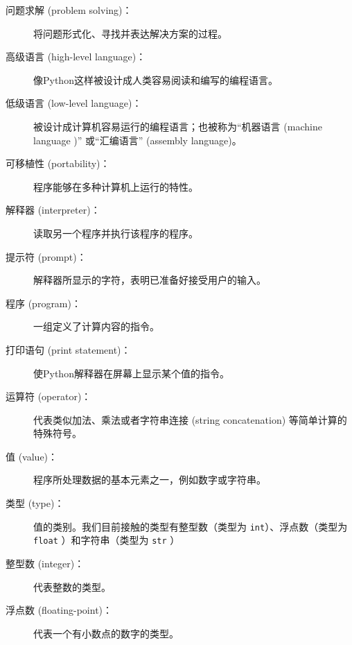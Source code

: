\begin{description}

\item[问题求解 (problem solving)：]  将问题形式化、寻找并表达解决方案的过程。
  

\item[高级语言 (high-level language)：]  像Python这样被设计成人类容易阅读和编写的编程语言。
  

\item[低级语言 (low-level language)：]  被设计成计算机容易运行的编程语言；也被称为``机器语言 (machine language )'' 或``汇编语言'' (assembly language)。
  

\item[可移植性 (portability)：]  程序能够在多种计算机上运行的特性。
  

\item[解释器 (interpreter)：]  读取另一个程序并执行该程序的程序。
  

\item[提示符 (prompt)：] 解释器所显示的字符，表明已准备好接受用户的输入。
  

\item[程序 (program)：] 一组定义了计算内容的指令。
  

\item[打印语句 (print statement)：]  使Python解释器在屏幕上显示某个值的指令。
  
  

\item[运算符 (operator)：]  代表类似加法、乘法或者字符串连接 (string concatenation) 等简单计算的特殊符号。
  

\item[值 (value)：]  程序所处理数据的基本元素之一，例如数字或字符串。
  

\item[类型 (type)：] 值的类别。我们目前接触的类型有整型数（类型为 \lstinline{int}）、浮点数（类型为 \lstinline{float} ）和字符串（类型为 \lstinline{str} ）
  

\item[整型数 (integer)：] 代表整数的类型。
  

\item[浮点数 (floating-point)：] 代表一个有小数点的数字的类型。
  


\end{description}
